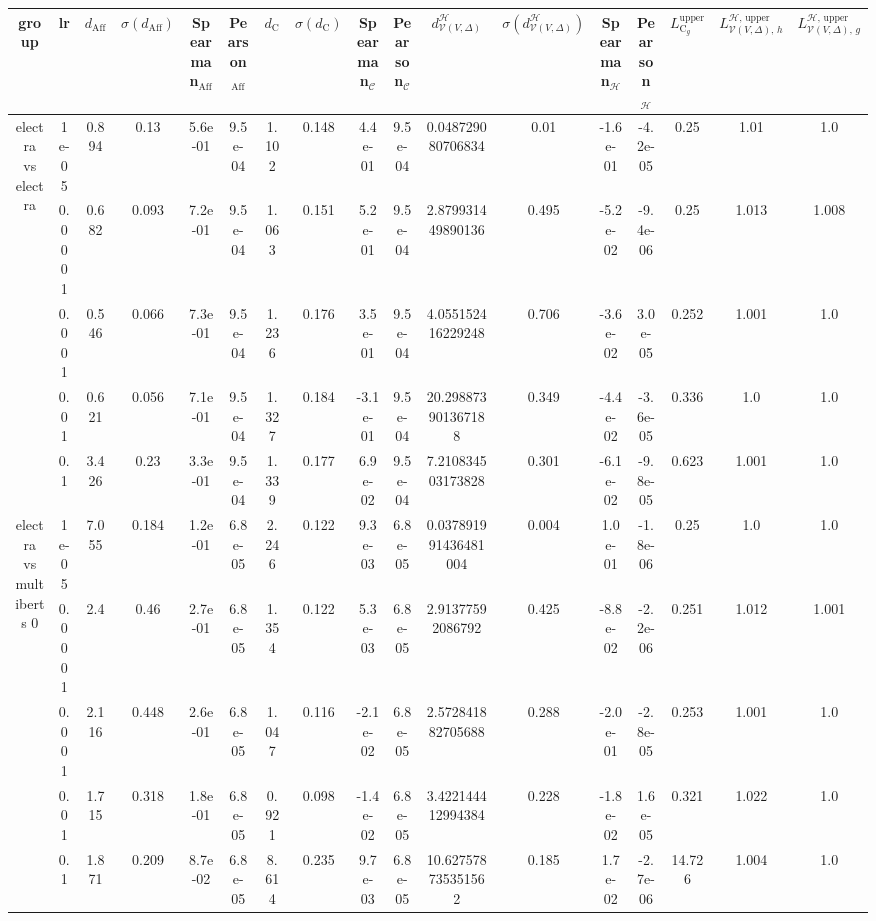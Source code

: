 \begin{tabular}{|c|c|c|c|c|c|c|c|c|c|c|c|c|c|c|c|c|}
\hline
group & lr & $d_{\mathrm{Aff}}$ & $\sigma(d_{\mathrm{Aff}})$ & Spearman$_{\mathrm{Aff}}$ & Pearson$_{\mathrm{Aff}}$ & $d_{\mathrm{C}}$ & $\sigma(d_{\mathrm{C}})$ & Spearman$_{\mathcal{C}}$ & Pearson$_{\mathcal{C}}$ & $d^\mathcal{H}_{\mathcal{V}(V,\Delta)}$ & $\sigma(d^\mathcal{H}_{\mathcal{V}(V,\Delta)})$ & Spearman$_{\mathcal{H}}$ & Pearson$_{\mathcal{H}}$ & $L_{\mathrm{C}_g}^{\mathrm{upper}}$ & $L^{\mathcal{H},\,\mathrm{upper}}_{\mathcal{V}(V,\Delta),\,h}$ & $L^{\mathcal{H},\,\mathrm{upper}}_{\mathcal{V}(V,\Delta),\,g}$ \\
\hline
\multirow{5}{*}{electra  vs electra } & 1e-05 & 0.894 & 0.13 & 5.6e-01 & 9.5e-04 & 1.102 & 0.148 & 4.4e-01 & 9.5e-04 & 0.048729080706834 & 0.01 & -1.6e-01 & -4.2e-05 & 0.25 & 1.01 & 1.0 \\
 & 0.0001 & 0.682 & 0.093 & 7.2e-01 & 9.5e-04 & 1.063 & 0.151 & 5.2e-01 & 9.5e-04 & 2.879931449890136 & 0.495 & -5.2e-02 & -9.4e-06 & 0.25 & 1.013 & 1.008 \\
 & 0.001 & 0.546 & 0.066 & 7.3e-01 & 9.5e-04 & 1.236 & 0.176 & 3.5e-01 & 9.5e-04 & 4.055152416229248 & 0.706 & -3.6e-02 & 3.0e-05 & 0.252 & 1.001 & 1.0 \\
 & 0.01 & 0.621 & 0.056 & 7.1e-01 & 9.5e-04 & 1.327 & 0.184 & -3.1e-01 & 9.5e-04 & 20.298873901367188 & 0.349 & -4.4e-02 & -3.6e-05 & 0.336 & 1.0 & 1.0 \\
 & 0.1 & 3.426 & 0.23 & 3.3e-01 & 9.5e-04 & 1.339 & 0.177 & 6.9e-02 & 9.5e-04 & 7.210834503173828 & 0.301 & -6.1e-02 & -9.8e-05 & 0.623 & 1.001 & 1.0 \\
\hline
\multirow{5}{*}{electra  vs multiberts 0} & 1e-05 & 7.055 & 0.184 & 1.2e-01 & 6.8e-05 & 2.246 & 0.122 & 9.3e-03 & 6.8e-05 & 0.037891991436481004 & 0.004 & 1.0e-01 & -1.8e-06 & 0.25 & 1.0 & 1.0 \\
 & 0.0001 & 2.4 & 0.46 & 2.7e-01 & 6.8e-05 & 1.354 & 0.122 & 5.3e-03 & 6.8e-05 & 2.91377592086792 & 0.425 & -8.8e-02 & -2.2e-06 & 0.251 & 1.012 & 1.001 \\
 & 0.001 & 2.116 & 0.448 & 2.6e-01 & 6.8e-05 & 1.047 & 0.116 & -2.1e-02 & 6.8e-05 & 2.572841882705688 & 0.288 & -2.0e-01 & -2.8e-05 & 0.253 & 1.001 & 1.0 \\
 & 0.01 & 1.715 & 0.318 & 1.8e-01 & 6.8e-05 & 0.921 & 0.098 & -1.4e-02 & 6.8e-05 & 3.422144412994384 & 0.228 & -1.8e-02 & 1.6e-05 & 0.321 & 1.022 & 1.0 \\
 & 0.1 & 1.871 & 0.209 & 8.7e-02 & 6.8e-05 & 8.614 & 0.235 & 9.7e-03 & 6.8e-05 & 10.627578735351562 & 0.185 & 1.7e-02 & -2.7e-06 & 14.726 & 1.004 & 1.0 \\

\end{tabular}
